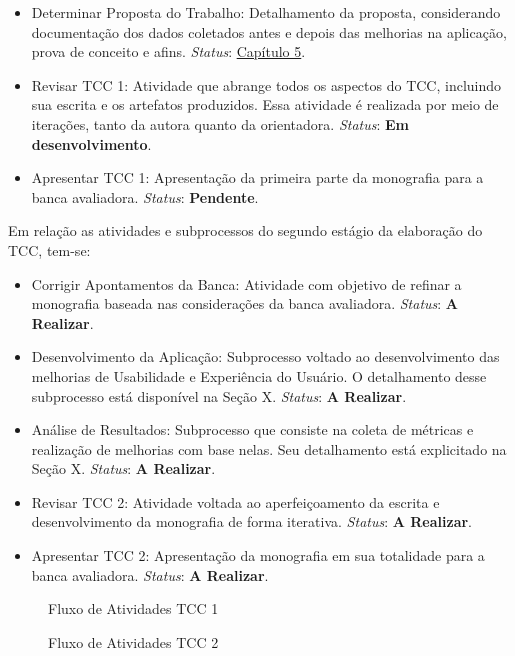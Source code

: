 \begin{itemize}
	\item Determinar Proposta do Trabalho: Detalhamento da proposta, considerando documentação dos dados coletados antes e depois das melhorias na aplicação, prova de conceito e afins. \textit{Status}: \hyperref[chap:Proposta]{Capítulo 5}.
	\item Revisar TCC 1: Atividade que abrange todos os aspectos do TCC, incluindo sua escrita e os artefatos produzidos. Essa atividade é realizada por meio de iterações, tanto da autora quanto da orientadora. \textit{Status}: \textbf{Em desenvolvimento}.
	\item Apresentar TCC 1: Apresentação da primeira parte da monografia para a banca avaliadora. \textit{Status}: \textbf{Pendente}.
\end{itemize}

Em relação as atividades e subprocessos do segundo estágio da elaboração do TCC, tem-se:

\begin{itemize}
	\item Corrigir Apontamentos da Banca: Atividade com objetivo de refinar a monografia baseada nas considerações da banca avaliadora. \textit{Status}: \textbf{A Realizar}.
	\item Desenvolvimento da Aplicação: Subprocesso voltado ao desenvolvimento das melhorias de Usabilidade e Experiência do Usuário. O detalhamento desse subprocesso está disponível na Seção X. \textit{Status}: \textbf{A Realizar}.
	\item Análise de Resultados: Subprocesso que consiste na coleta de métricas e realização de melhorias com base nelas. Seu detalhamento está explicitado na Seção X. \textit{Status}: \textbf{A Realizar}.
	\item Revisar TCC 2: Atividade voltada ao aperfeiçoamento da escrita e desenvolvimento da monografia de forma iterativa. \textit{Status}: \textbf{A Realizar}.
	\item Apresentar TCC 2: Apresentação da monografia em sua totalidade para a banca avaliadora. \textit{Status}: \textbf{A Realizar}.
\end{itemize}

\begin{figure}[h!]
	\centering
	\caption{Fluxo de Atividades TCC 1}
	\label{fig04}
\end{figure}

\begin{figure}[h!]
	\centering
	\caption{Fluxo de Atividades TCC 2}
	\label{fig05}
\end{figure}

